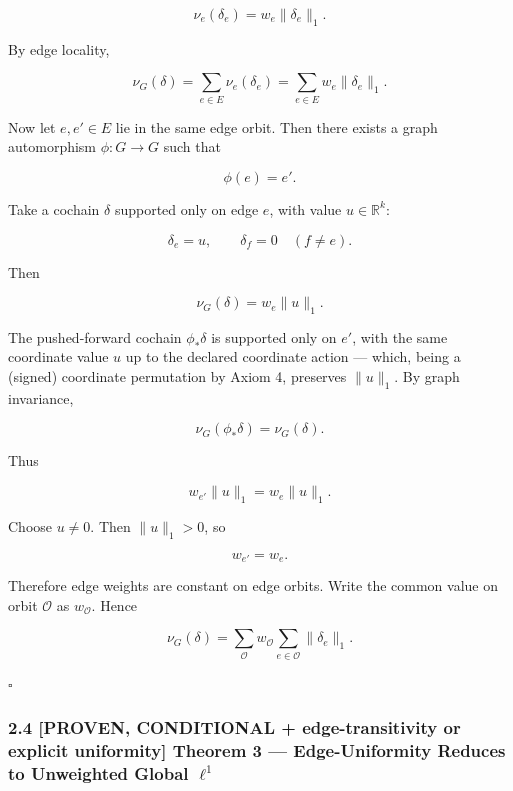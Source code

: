 \documentclass[
  11pt,
]{article}
\begin{document}
\[
\nu_e(\delta_e)=w_e\|\delta_e\|_1.
\]

By edge locality,

\[
\nu_G(\delta) = \sum_{e\in E}\nu_e(\delta_e) = \sum_{e\in E}w_e\|\delta_e\|_1.
\]

Now let \(e,e'\in E\) lie in the same edge orbit. Then there exists a
graph automorphism \(\phi:G\to G\) such that

\[
\phi(e)=e'.
\]

Take a cochain \(\delta\) supported only on edge \(e\), with value
\(u\in\mathbb R^k\):

\[
\delta_e=u,\qquad \delta_f=0\quad(f\ne e).
\]

Then

\[
\nu_G(\delta)=w_e\|u\|_1.
\]

The pushed-forward cochain \(\phi_*\delta\) is supported only on \(e'\),
with the same coordinate value \(u\) up to the declared coordinate
action --- which, being a (signed) coordinate permutation by Axiom 4,
preserves \(\|u\|_1\). By graph invariance,

\[
\nu_G(\phi_*\delta)=\nu_G(\delta).
\]

Thus

\[
w_{e'}\|u\|_1=w_e\|u\|_1.
\]

Choose \(u\ne0\). Then \(\|u\|_1>0\), so

\[
w_{e'}=w_e.
\]

Therefore edge weights are constant on edge orbits. Write the common
value on orbit \(\mathcal O\) as \(w_{\mathcal O}\). Hence

\[
\nu_G(\delta) = \sum_{\mathcal O} w_{\mathcal O} \sum_{e\in\mathcal O} \|\delta_e\|_1.
\]

\(\square\)

\hypertarget{proven-conditional-edge-transitivity-or-explicit-uniformity-theorem-3-edge-uniformity-reduces-to-unweighted-global-ell1}{%
\subsubsection{\texorpdfstring{2.4 \textbf{{[}PROVEN, CONDITIONAL +
edge-transitivity or explicit uniformity{]} Theorem 3 ---
Edge-Uniformity Reduces to Unweighted Global
\(\ell^1\)}}{2.4 {[}PROVEN, CONDITIONAL + edge-transitivity or explicit uniformity{]} Theorem 3 --- Edge-Uniformity Reduces to Unweighted Global \textbackslash ell\^{}1}}\label{proven-conditional-edge-transitivity-or-explicit-uniformity-theorem-3-edge-uniformity-reduces-to-unweighted-global-ell1}}
\end{document}
